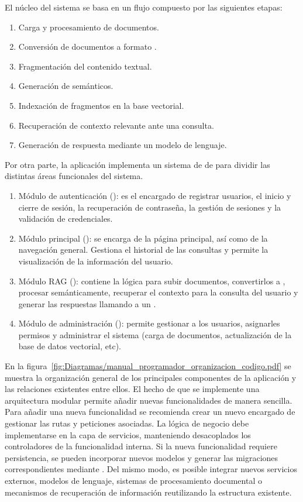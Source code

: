 El núcleo del sistema se basa en un flujo  compuesto por las siguientes etapas:
\begin{enumerate}
\tightlist
	\item Carga y procesamiento de documentos.
	\item Conversión de documentos a formato .
	\item Fragmentación del contenido textual.
	\item Generación de  semánticos.
	\item Indexación de fragmentos en la base vectorial.
	\item Recuperación de contexto relevante ante una consulta.
	\item Generación de respuesta mediante un modelo de lenguaje.
\end{enumerate}

Por otra parte, la aplicación implementa un sistema de  de  para dividir las distintas áreas funcionales del sistema.

\begin{enumerate}
\tightlist
	 \item Módulo de autenticación (): es el encargado de registrar usuarios, el inicio y cierre de sesión, la recuperación de contraseña, la gestión de sesiones y la validación de credenciales.
	 \item Módulo principal (): se encarga de la página principal, así como de la navegación general. Gestiona el historial de las consultas y permite la visualización de la información del usuario.
	 \item Módulo RAG (): contiene la lógica para subir documentos, convertirlos a , procesar semánticamente, recuperar el contexto para la consulta del usuario y generar las respuestas llamando a un .
	 \item Módulo de administración (): permite gestionar a los usuarios, asignarles permisos y administrar el sistema (carga de documentos, actualización de la base de datos vectorial, etc).
\end{enumerate}

En la figura~\ref{fig:Diagramas/manual_programador_organizacion_codigo.pdf} se muestra la organización general de los principales componentes  de la aplicación y las relaciones existentes entre ellos. El hecho de que se implemente una arquitectura modular permite añadir nuevas funcionalidades de manera sencilla. Para añadir una nueva funcionalidad se recomienda crear un nuevo  encargado de gestionar las rutas y peticiones  asociadas. La lógica de negocio debe implementarse en la capa de servicios, manteniendo desacoplados los controladores de la funcionalidad interna. Si la nueva funcionalidad requiere persistencia, se pueden incorporar nuevos modelos  y generar las migraciones correspondientes mediante . Del mismo modo, es posible integrar nuevos servicios externos, modelos de lenguaje, sistemas de procesamiento documental o mecanismos de recuperación de información reutilizando la estructura existente.

